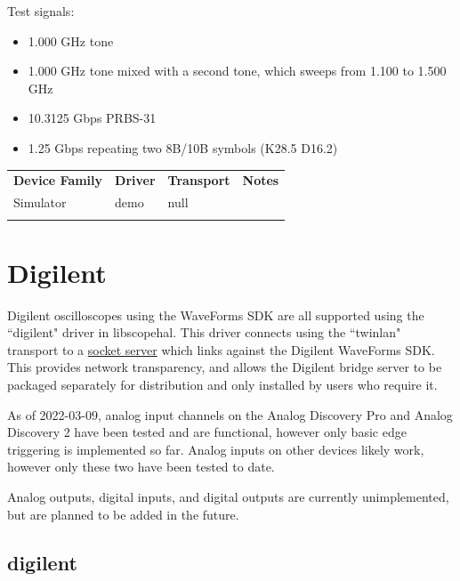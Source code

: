 Test signals:
\begin{itemize}
\item 1.000 GHz tone
\item 1.000 GHz tone mixed with a second tone, which sweeps from 1.100 to 1.500 GHz
\item 10.3125 Gbps PRBS-31
\item 1.25 Gbps repeating two 8B/10B symbols (K28.5 D16.2)
\end{itemize}

\begin{tabularx}{16cm}{lllX}
\thickhline
\textbf{Device Family} & \textbf{Driver} & \textbf{Transport} & \textbf{Notes} \\
\thickhline
Simulator & demo & null & \\
\thickhline
\end{tabularx}

\section{Digilent}

Digilent oscilloscopes using the WaveForms SDK are all supported using the ``digilent" driver in libscopehal. This
driver connects using the ``twinlan" transport to a \href{https://github.com/azonenberg/scopehal-waveforms-bridge}
{socket server} which links against the Digilent WaveForms SDK. This provides network transparency, and allows the
Digilent bridge server to be packaged separately for distribution and only installed by users who require it.

As of 2022-03-09, analog input channels on the Analog Discovery Pro and Analog Discovery 2 have been tested and are
functional, however only basic edge triggering is implemented so far. Analog inputs on other devices likely work,
however only these two have been tested to date.

Analog outputs, digital inputs, and digital outputs are currently unimplemented, but are planned to be added in the
future.

\subsection{digilent}

